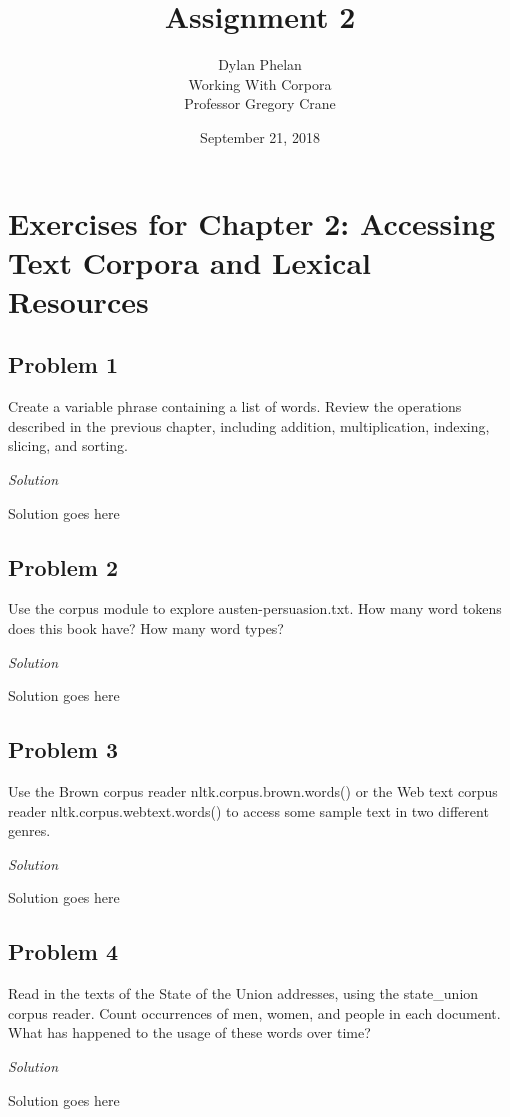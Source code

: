 \documentclass[11pt]{article}
\author{ 
	Dylan Phelan \\ 
	Working With Corpora \\ 
	Professor Gregory Crane 
}
\title{Assignment 2}
\date{September 21, 2018}
\newenvironment{solution}[1][]{
	\vspace{10px}\noindent\emph{Solution #1}
}{
	\vspace{10px}
}
\begin{document}
\maketitle

\section*{Exercises for Chapter 2: Accessing Text Corpora and Lexical Resources}
\subsection*{Problem 1}

Create a variable phrase containing a list of words. Review the operations described in the previous chapter, including addition, multiplication, indexing, slicing, and sorting.

\begin{solution}
	Solution goes here
\end{solution} 


\subsection*{Problem 2}
Use the corpus module to explore austen-persuasion.txt. How many word tokens does this book have? How many word types?

\begin{solution}
	Solution goes here
\end{solution}  


\subsection*{Problem 3}
Use the Brown corpus reader nltk.corpus.brown.words() or the Web text corpus reader nltk.corpus.webtext.words() to access some sample text in two different genres.

\begin{solution}
	Solution goes here
\end{solution}  


\subsection*{Problem 4}
Read in the texts of the State of the Union addresses, using the state\_union corpus reader. Count occurrences of men, women, and people in each document. What has happened to the usage of these words over time?

\begin{solution}
	Solution goes here
\end{solution}  
\end{document}
